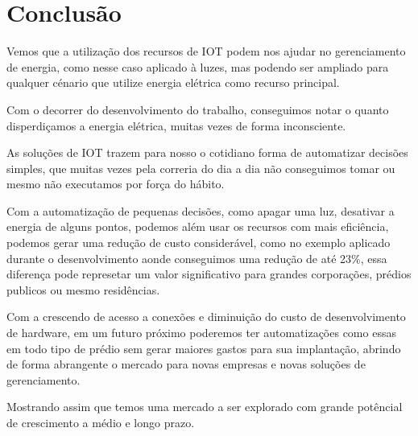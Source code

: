 \documentclass[openright]{normas-utf-tex} %
\begin{document}
\chapter{Conclusão}

Vemos que a utilização dos recursos de IOT podem nos ajudar no gerenciamento de energia, como nesse caso aplicado à luzes, mas podendo ser ampliado para qualquer cénario que utilize energia elétrica como recurso principal.

Com o decorrer do desenvolvimento do trabalho, conseguimos notar o quanto disperdiçamos a energia elétrica, muitas vezes de forma inconsciente.   

As soluções de IOT trazem para nosso o cotidiano forma de automatizar decisões simples, que muitas vezes pela correria do dia a dia não conseguimos tomar ou mesmo não executamos por força do hábito. 

Com a automatização de pequenas decisões, como apagar uma luz, desativar a energia de alguns pontos, podemos além usar os recursos com mais eficiência, podemos gerar uma redução de custo considerável, como no exemplo aplicado durante o desenvolvimento aonde conseguimos uma redução de até 23\%, essa diferença pode represetar um valor significativo para grandes corporações, prédios publicos ou mesmo residências.

Com a crescendo de acesso a conexões e diminuição do custo de desenvolvimento de hardware, em um futuro próximo poderemos ter automatizações como essas em todo tipo de prédio sem gerar maiores gastos para sua implantação, abrindo de forma abrangente o mercado para novas empresas e novas soluções de gerenciamento.

Mostrando assim que temos uma mercado a ser explorado com grande potêncial de crescimento a médio e longo prazo.

\label{bibstart}
\label{bibend}

%
%
%
%
\end{document}
